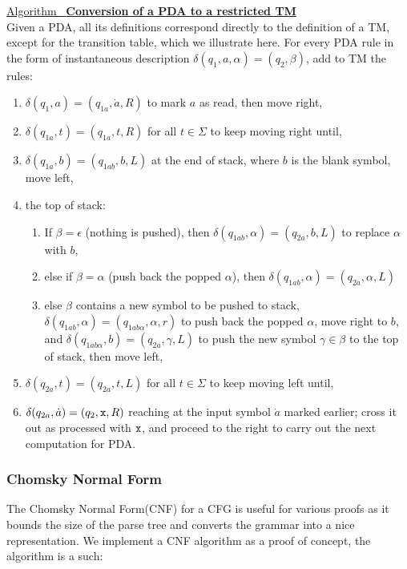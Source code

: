 \documentclass[12pt]{article}  %
\newcommand{\algtitle}[1]{\underline{Algorithm \ {\bf #1}} \vspace*{1mm}\\}
\begin{document}
\algtitle{Conversion of a PDA to a restricted TM}
Given a PDA, all its definitions correspond directly to the definition of a TM, except for the transition table, which we illustrate here. For every PDA rule in the form of instantaneous description $\delta(q_1, a, \alpha) = (q_2, \beta)$, add to TM the rules:
\begin{enumerate}
	\item $\delta(q_1, a) = (q_{1a}, \dot a, R)$ to mark $a$ as read, then move right,
	\item $\delta(q_{1a}, t) = (q_{1a}, t, R)$ for all $t \in \Sigma$ to keep moving right until,
	\item $\delta(q_{1a}, b) = (q_{1ab}, b, L)$ at the end of stack, where $b$ is the blank symbol, move left,
	\item the top of stack:
	\begin{enumerate}
		\item If $\beta = \epsilon$ (nothing is pushed), then $\delta(q_{1ab}, \alpha) = (q_{2a}, b, L)$ to replace $\alpha$ with $b$,
		\item else if $\beta = \alpha$ (push back the popped $\alpha$), then $\delta(q_{1ab}, \alpha) = (q_{2a}, \alpha, L)$
		\item else $\beta$ contains a new symbol to be pushed to stack, $\delta(q_{1ab}, \alpha) = (q_{1ab\alpha}, \alpha, r)$ to push back the popped $\alpha$, move right to $b$, and $\delta(q_{1ab\alpha}, b) = (q_{2a}, \gamma, L)$ to push the new symbol $\gamma \in \beta$ to the top of stack, then move left,
	\end{enumerate}
	\item $\delta(q_{2a}, t) = (q_{2a}, t, L)$ for all $t \in \Sigma$ to keep moving left until,
	\item $\delta(q_{2a}, \dot a) = (q_{2}, {\tt x}, R)$ reaching at the input symbol $\dot a$ marked earlier; cross it out as processed with ${\tt x}$, and proceed to the right to carry out the next computation for PDA.	
\end{enumerate}




\subsubsection{Chomsky Normal Form}
The Chomsky Normal Form(CNF) for a CFG is useful for various proofs as it bounds the size of the parse tree and converts the grammar into a nice representation. We implement a CNF algorithm as a proof of concept, the algorithm is a such:
\end{document}
